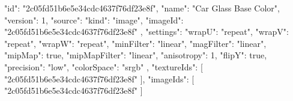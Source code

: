 {
  "id": "2c05fd51b6e5e34cdc4637f76df23e8f",
  "name": "Car Glass Base Color",
  "version": 1,
  "source": {
    "kind": "image",
    "imageId": "2c05fd51b6e5e34cdc4637f76df23e8f"
  },
  "settings": {
    "wrapU": "repeat",
    "wrapV": "repeat",
    "wrapW": "repeat",
    "minFilter": "linear",
    "magFilter": "linear",
    "mipMap": true,
    "mipMapFilter": "linear",
    "anisotropy": 1,
    "flipY": true,
    "precision": "low",
    "colorSpace": "srgb"
  },
  "textureIds": [
    "2c05fd51b6e5e34cdc4637f76df23e8f"
  ],
  "imageIds": [
    "2c05fd51b6e5e34cdc4637f76df23e8f"
  ]
}
